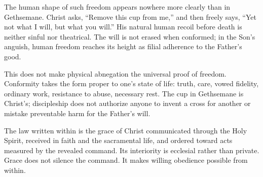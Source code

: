 The human shape of such freedom appears nowhere more clearly than in Gethsemane. Christ asks, ``Remove this cup from me,'' and then freely says, ``Yet not what I will, but what you will.'' His natural human recoil before death is neither sinful nor theatrical. The will is not erased when conformed; in the Son's anguish, human freedom reaches its height as filial adherence to the Father's good.

This does not make physical abnegation the universal proof of freedom. Conformity takes the form proper to one's state of life: truth, care, vowed fidelity, ordinary work, resistance to abuse, necessary rest. The cup in Gethsemane is Christ's; discipleship does not authorize anyone to invent a cross for another or mistake preventable harm for the Father's will.

The law written within is the grace of Christ communicated through the Holy Spirit, received in faith and the sacramental life, and ordered toward acts measured by the revealed command. Its interiority is ecclesial rather than private. Grace does not silence the command. It makes willing obedience possible from within.
